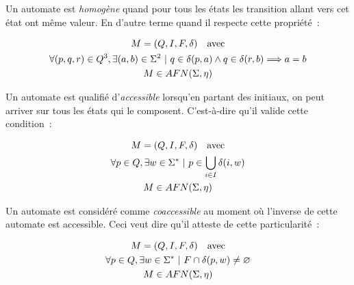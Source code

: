 \begin{definition}
    Un automate est \textit{homogène} quand pour tous les états les transition
    allant vers cet état ont même valeur. En d'autre terme quand il respecte
    cette propriété~:

    \begin{gather*}
        M = (Q, I, F, \delta) \quad \text{avec} \\
        \forall (p, q, r) \in Q^3, \exists (a, b) \in \Sigma^2 ~|~ q \in \delta(p, a) \land q \in \delta(r, b) \Longrightarrow a = b \notag \\
        M \in AFN(\Sigma, \eta) \notag
    \end{gather*}
\end{definition}

\begin{definition}
    Un automate est qualifié d'\textit{accessible} lorsqu'en partant des initiaux,
    on peut arriver sur tous les états qui le composent. C'est-à-dire qu'il valide
    cette condition~:

    \begin{gather*}
        M = (Q, I, F, \delta) \quad \text{avec} \\
        \forall p \in Q, \exists w \in \Sigma^* ~|~ p \in \bigcup_{i \in I} \delta(i, w) \notag \\
        M \in AFN(\Sigma, \eta) \notag
    \end{gather*}
\end{definition}

\begin{definition}
    Un automate est considéré comme \textit{coaccessible} au moment où l'inverse de
    cette automate est accessible. Ceci veut dire qu'il atteste de cette
    particularité~:

    \begin{gather*}
        M = (Q, I, F, \delta) \quad \text{avec} \\
        \forall p \in Q, \exists w \in \Sigma^* ~|~ F \cap \delta(p, w) \neq \varnothing \notag \\
        M \in AFN(\Sigma, \eta) \notag
    \end{gather*}
\end{definition}

